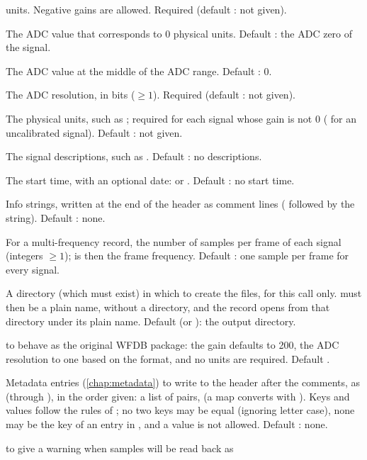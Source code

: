 \begin{params}
  units. Negative gains are allowed. Required (default : not given).
\item[baselines] The ADC value that corresponds to 0 physical units. Default
  : the ADC zero of the signal.
\item[adczeros] The ADC value at the middle of the ADC range. Default : 0.
\item[adcres] The ADC resolution, in bits ($\ge 1$). Required (default : not
  given).
\item[units] The physical units, such as ; required for each signal whose gain
  is not 0 ( for an uncalibrated signal). Default : not given.
\item[names] The signal descriptions, such as . Default : no
  descriptions.
\item[baseTime] The start time, with an optional date:  or
  . Default : no start time.
\item[comments] Info strings, written at the end of the header as comment lines
  ( followed by the string). Default : none.
\item[sampsPerFrame] For a multi-frequency record, the number of samples per frame of
  each signal (integers $\ge 1$);  is then the frame frequency. Default
  : one sample per frame for every signal.
\item[dir] A directory (which must exist) in which to create the files, for this call
  only.  must then be a plain name, without a directory, and the record opens
  from that directory under its plain name. Default  (or ): the output
  directory.
\item[legacy]  to behave as the original WFDB package: the gain defaults to
  200, the ADC resolution to one based on the format, and no units are required. Default
  .
\item[metadata] Metadata entries (\cref{chap:metadata}) to write to the header after the
  comments, as  (through ), in the order given: a list
  of pairs,  (a map converts with ). Keys and
  values follow the rules of ; no two keys may be equal (ignoring
  letter case), none may be the key of an entry in , and a 
  value is not allowed. Default : none.
\item[invalidWarning]  to give a warning when samples will be read back as

\end{params}
